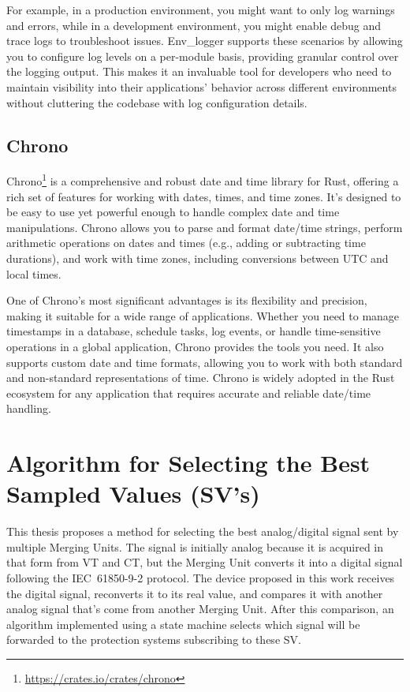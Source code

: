 For example, in a production environment, you might want to only log warnings and errors, while in a development environment, you might enable debug and trace logs to troubleshoot issues. Env\_logger supports these scenarios by allowing you to configure log levels on a per-module basis, providing granular control over the logging output. This makes it an invaluable tool for developers who need to maintain visibility into their applications’ behavior across different environments without cluttering the codebase with log configuration details.

\subsection{Chrono}

Chrono\footnote{\url{https://crates.io/crates/chrono}} is a comprehensive and robust date and time library for Rust, offering a rich set of features for working with dates, times, and time zones. It’s designed to be easy to use yet powerful enough to handle complex date and time manipulations. Chrono allows you to parse and format date/time strings, perform arithmetic operations on dates and times (e.g., adding or subtracting time durations), and work with time zones, including conversions between UTC and local times.

One of Chrono's most significant advantages is its flexibility and precision, making it suitable for a wide range of applications. Whether you need to manage timestamps in a database, schedule tasks, log events, or handle time-sensitive operations in a global application, Chrono provides the tools you need. It also supports custom date and time formats, allowing you to work with both standard and non-standard representations of time. Chrono is widely adopted in the Rust ecosystem for any application that requires accurate and reliable date/time handling.

\section{Algorithm for Selecting the Best Sampled Values (SV's)}

This thesis proposes a method for selecting the best analog/digital signal sent by multiple Merging Units. The signal is initially analog because it is acquired in that form from VT and CT, but the Merging Unit converts it into a digital signal following the IEC~61850-9-2 protocol. The device proposed in this work receives the digital signal, reconverts it to its real value, and compares it with another analog signal that's come from another Merging Unit. After this comparison, an algorithm implemented using a state machine selects which signal will be forwarded to the protection systems subscribing to these SV.

